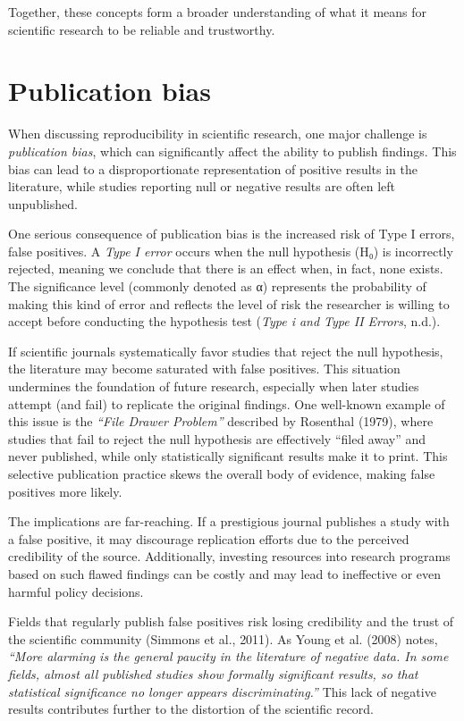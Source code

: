 \documentclass[
  a4paper,
]{article}
\begin{document}
Together, these concepts form a broader understanding of what it means
for scientific research to be reliable and trustworthy.

\section{Publication bias}\label{publication-bias}

When discussing reproducibility in scientific research, one major
challenge is \emph{publication bias}, which can significantly affect the
ability to publish findings. This bias can lead to a disproportionate
representation of positive results in the literature, while studies
reporting null or negative results are often left unpublished.

One serious consequence of publication bias is the increased risk of
Type I errors, false positives. A \emph{Type I error} occurs when the
null hypothesis (H₀) is incorrectly rejected, meaning we conclude that
there is an effect when, in fact, none exists. The significance level
(commonly denoted as α) represents the probability of making this kind
of error and reflects the level of risk the researcher is willing to
accept before conducting the hypothesis test (\emph{Type i and Type II
Errors}, n.d.).

If scientific journals systematically favor studies that reject the null
hypothesis, the literature may become saturated with false positives.
This situation undermines the foundation of future research, especially
when later studies attempt (and fail) to replicate the original
findings. One well-known example of this issue is the \emph{``File
Drawer Problem''} described by Rosenthal (1979), where studies that fail
to reject the null hypothesis are effectively ``filed away'' and never
published, while only statistically significant results make it to
print. This selective publication practice skews the overall body of
evidence, making false positives more likely.

The implications are far-reaching. If a prestigious journal publishes a
study with a false positive, it may discourage replication efforts due
to the perceived credibility of the source. Additionally, investing
resources into research programs based on such flawed findings can be
costly and may lead to ineffective or even harmful policy decisions.

Fields that regularly publish false positives risk losing credibility
and the trust of the scientific community (Simmons et al., 2011). As
Young et al. (2008) notes, \emph{``More alarming is the general paucity
in the literature of negative data. In some fields, almost all published
studies show formally significant results, so that statistical
significance no longer appears discriminating.''} This lack of negative
results contributes further to the distortion of the scientific record.
\end{document}
